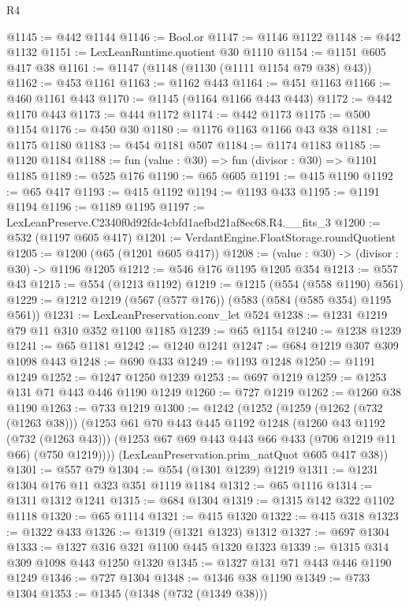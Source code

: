 \begin{lexlean}{R4}
\begin{coremodule}
@1145 := @442 @1144
@1146 := Bool.or
@1147 := @1146 @1122
@1148 := @442 @1132
@1151 := LexLeanRuntime.quotient @30 @1110
@1154 := @1151 @605 @417 @38
@1161 := @1147 (@1148 (@1130 (@1111 @1154 @79 @38) @43))
@1162 := @453 @1161
@1163 := @1162 @443
@1164 := @451 @1163
@1166 := @460 @1161 @443
@1170 := @1145 (@1164 @1166 @443 @443)
@1172 := @442 @1170 @443
@1173 := @444 @1172
@1174 := @442 @1173
@1175 := @500 @1154
@1176 := @450 @30
@1180 := @1176 @1163 @1166 @43 @38
@1181 := @1175 @1180
@1183 := @454 @1181 @507
@1184 := @1174 @1183
@1185 := @1120 @1184
@1188 := fun (value : @30) => fun (divisor : @30) => @1101 @1185
@1189 := @525 @176
@1190 := @65 @605
@1191 := @415 @1190
@1192 := @65 @417
@1193 := @415 @1192
@1194 := @1193 @433
@1195 := @1191 @1194
@1196 := @1189 @1195
@1197 := LexLeanPreserve.C2340f0d92fde4cbfd1aefbd21af8ec68.R4.__fits_3
@1200 := @532 (@1197 @605 @417)
@1201 := VerdantEngine.FloatStorage.roundQuotient
@1205 := @1200 (@65 (@1201 @605 @417))
@1208 := (value : @30) -> (divisor : @30) -> @1196 @1205
@1212 := @546 @176 @1195 @1205 @354
@1213 := @557 @43
@1215 := @554 (@1213 @1192)
@1219 := @1215 (@554 (@558 @1190) @561)
@1229 := @1212 @1219 (@567 (@577 @176)) (@583 (@584 (@585 @354) @1195 @561))
@1231 := LexLeanPreservation.conv_let @524
@1238 := @1231 @1219 @79 @11 @310 @352 @1100 @1185
@1239 := @65 @1154
@1240 := @1238 @1239
@1241 := @65 @1181
@1242 := @1240 @1241
@1247 := @684 @1219 @307 @309 @1098 @443
@1248 := @690 @433
@1249 := @1193 @1248
@1250 := @1191 @1249
@1252 := @1247 @1250 @1239
@1253 := @697 @1219
@1259 := @1253 @131 @71 @443 @446 @1190 @1249
@1260 := @727 @1219
@1262 := @1260 @38 @1190
@1263 := @733 @1219
@1300 := @1242
    (@1252
      (@1259
        (@1262 (@732 (@1263 @38)))
        (@1253
          @61
          @70
          @443
          @445
          @1192
          @1248
          (@1260 @43 @1192 (@732 (@1263 @43)))
          (@1253 @67 @69 @443 @443 @66 @433 (@706 @1219 @11 @66) (@750 @1219))))
      (LexLeanPreservation.prim_natQuot @605 @417 @38))
@1301 := @557 @79
@1304 := @554 (@1301 @1239) @1219
@1311 := @1231 @1304 @176 @11 @323 @351 @1119 @1184
@1312 := @65 @1116
@1314 := @1311 @1312 @1241
@1315 := @684 @1304
@1319 := @1315 @142 @322 @1102 @1118
@1320 := @65 @1114
@1321 := @415 @1320
@1322 := @415 @318
@1323 := @1322 @433
@1326 := @1319 (@1321 @1323) @1312
@1327 := @697 @1304
@1333 := @1327 @316 @321 @1100 @445 @1320 @1323
@1339 := @1315 @314 @309 @1098 @443 @1250 @1320
@1345 := @1327 @131 @71 @443 @446 @1190 @1249
@1346 := @727 @1304
@1348 := @1346 @38 @1190
@1349 := @733 @1304
@1353 := @1345 (@1348 (@732 (@1349 @38)))

\end{coremodule}
\end{lexlean}
